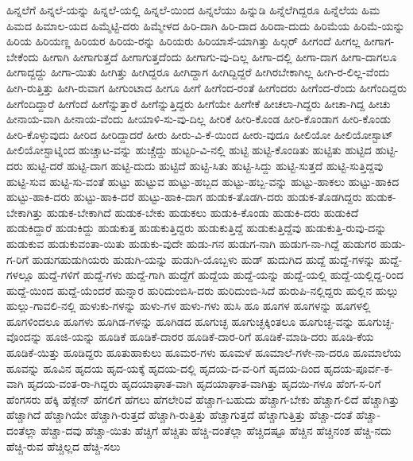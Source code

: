 {ಹಿನ್ನಲೆಗೆ
ಹಿನ್ನಲೆ-ಯನ್ನು
ಹಿನ್ನಲೆ-ಯಲ್ಲಿ
ಹಿನ್ನಲೆ-ಯಿಂದ
ಹಿನ್ನಲೆಯು
ಹಿನ್ನುಡಿ
ಹಿನ್ನೆಲೆಗಿದ್ದರೂ
ಹಿನ್ನೆಲೆಯ
ಹಿಮ
ಹಿಮದ
ಹಿಮಾಲ-ಯದ
ಹಿಮ್ಮೆಟ್ಟಿ-ದರು
ಹಿಮ್ಮೇಳದ
ಹಿರಿ-ದಾಗಿ
ಹಿರಿ-ದಾದ
ಹಿರಿದಾ-ದುದು
ಹಿರಿಮೆಯ
ಹಿರಿಮೆ-ಯನ್ನು
ಹಿರಿಯ
ಹಿರಿಯಣ್ಣ
ಹಿರಿಯರ
ಹಿರಿಯ-ರನ್ನು
ಹಿರಿಯರು
ಹಿರಿಯಾಸೆ-ಯಾಗಿತ್ತು
ಹಿಲ್ಗರ್
ಹೀಗಂದೆ
ಹೀಗಲ್ಲ
ಹೀಗಾಗ-ಬೇಕೆಂದು
ಹೀಗಾಗಿ
ಹೀಗಾಗುತ್ತದೆ
ಹೀಗಾಗುತ್ತದೆಂದು
ಹೀಗಾಗು-ವು-ದಿಲ್ಲ
ಹೀಗಾ-ದಲ್ಲಿ
ಹೀಗಾ-ದಾಗ
ಹೀಗಾ-ದಾಗಲೂ
ಹೀಗಾದ್ದದ್ದು
ಹೀಗಾ-ಯಿತು
ಹೀಗಿತ್ತು
ಹೀಗಿದ್ದರೂ
ಹೀಗಿದ್ದಾಗ
ಹೀಗಿದ್ದಿದ್ದರೆ
ಹೀಗಿರಬೇಕಾಗಿಲ್ಲ
ಹೀಗಿ-ರ-ಲಿಲ್ಲ-ವೆಂದು
ಹೀಗಿ-ರುತ್ತಿತ್ತು
ಹೀಗಿ-ರುವಾಗ
ಹೀಗುಂಟಾದ
ಹೀಗೂ
ಹೀಗೆ
ಹೀಗೆಂದ-ರಂತೆ
ಹೀಗೆಂದರು
ಹೀಗೆಂದ-ರೆಂದು
ಹೀಗೆಂದಿದ್ದರು
ಹೀಗೆಂದಿದ್ದಾರೆ
ಹೀಗೆಂದೆ
ಹೀಗೆನ್ನುತ್ತಾರೆ
ಹೀಗೆನ್ನುತ್ತಿದ್ದರು
ಹೀಗೆಯೇ
ಹೀಗೇಕೆ
ಹೀಚಲಾ-ಗಿದ್ದರು
ಹೀಚಾ-ಗಿದ್ದ
ಹೀಚು
ಹೀನಾಯ-ವಾಗಿ
ಹೀನಾಯ-ವೆಂದು
ಹೀಯಾಳಿ-ಸು-ವು-ದಿಲ್ಲ
ಹೀರಿಕೆ
ಹೀರಿ-ಕೊಂಡ
ಹೀರಿ-ಕೊಂಡಾಗ
ಹೀರಿ-ಕೊಂಡು
ಹೀರಿ-ಕೊಳ್ಳುವುದು
ಹೀರಿದ
ಹೀರಿದ್ದಾದರೆ
ಹೀರು
ಹೀರು-ವಿ-ಕೆ-ಯಿಂದ
ಹೀರು-ವುದೂ
ಹೀಲಿಯೋ
ಹೀಲಿಯೋಸ್ಟಾಟ್
ಹೀಲಿಯೋಸ್ಟಾಟ್ನಿಂದ
ಹುಚ್ಚಾಟ-ವನ್ನು
ಹುಚ್ಚೆದ್ದು
ಹುಟ್ಟರಿ-ವಿ-ನಲ್ಲಿ
ಹುಟ್ಟಿ
ಹುಟ್ಟಿ-ಕೊಂಡಿತು
ಹುಟ್ಟಿತು
ಹುಟ್ಟಿದ
ಹುಟ್ಟಿ-ದರು
ಹುಟ್ಟಿ-ದರೆ
ಹುಟ್ಟಿ-ದಾಗ
ಹುಟ್ಟಿ-ದುದು
ಹುಟ್ಟಿದೆ
ಹುಟ್ಟಿ-ಸಿತು
ಹುಟ್ಟಿ-ಸಿದ್ದು
ಹುಟ್ಟಿ-ಸುತ್ತದೆ
ಹುಟ್ಟಿ-ಸುತ್ತಿದ್ದವು
ಹುಟ್ಟಿ-ಸುವ
ಹುಟ್ಟಿ-ಸು-ವಂತೆ
ಹುಟ್ಟು
ಹುಟ್ಟುವ
ಹುಟ್ಟು-ಹಬ್ಬದ
ಹುಟ್ಟು-ಹಬ್ಬ-ವನ್ನು
ಹುಟ್ಟು-ಹಾಕಲು
ಹುಟ್ಟು-ಹಾಕಿದ
ಹುಟ್ಟು-ಹಾಕಿ-ದರು
ಹುಟ್ಟು-ಹಾಕಿ-ದರೆ
ಹುಟ್ಟು-ಹಾಕಿ-ದಾಗ
ಹುಡುಕ-ತೊಡಗಿ-ದರು
ಹುಡುಕ-ತೊಡಗಿದ್ದರು
ಹುಡುಕ-ಬೇಕಾಗಿತ್ತು
ಹುಡುಕ-ಬೇಕಾಗಿದೆ
ಹುಡುಕ-ಬೇಕು
ಹುಡುಕಲು
ಹುಡುಕಿ-ಕೊಂಡು
ಹುಡುಕಿ-ದರು
ಹುಡುಕಿದೆ
ಹುಡುಕಿದ್ದಾರೆ
ಹುಡುಕಿದ್ದು
ಹುಡುಕುತ್ತ
ಹುಡುಕುತ್ತಿದ್ದರು
ಹುಡುಕುತ್ತಿದ್ದೆ
ಹುಡುಕುತ್ತಿದ್ದೆವು
ಹುಡುಕುತ್ತಿ-ರುವು-ದನ್ನು
ಹುಡುಕುವ
ಹುಡುಕುವಂತಾ-ಯಿತು
ಹುಡುಕು-ವುದೇ
ಹುಡು-ಗನ
ಹುಡುಗ-ನಾಗಿ
ಹುಡುಗ-ನಾ-ಗಿದ್ದೆ
ಹುಡುಗರ
ಹುಡು-ಗ-ರಿಗೆ
ಹುಡುಗಹುಡುಗಿಯರು
ಹುಡುಗಿ-ಯನ್ನು
ಹುಡುಗಿ-ಯೊಬ್ಬಳು
ಹುಡ್
ಹುದುಗಿದ
ಹುದ್ದೆ
ಹುದ್ದೆ-ಗಳನ್ನು
ಹುದ್ದೆ-ಗಳಲ್ಲೂ
ಹುದ್ದೆ-ಗಳಿಗೆ
ಹುದ್ದೆ-ಗಳು
ಹುದ್ದೆ-ಗಾಗಿ
ಹುದ್ದೆಗೆ
ಹುದ್ದೆಯ
ಹುದ್ದೆ-ಯನ್ನು
ಹುದ್ದೆ-ಯಲ್ಲಿ
ಹುದ್ದೆ-ಯಲ್ಲಿದ್ದ-ರಿಂದ
ಹುದ್ದೆ-ಯಿಂದ
ಹುದ್ದೆ-ಯೆಂದರೆ
ಹುನ್ನಾರ
ಹುರಿದುಂಬಿಸಿ-ದರು
ಹುರಿದುಂಬಿ-ಸಿದೆ
ಹುರುಪಿ-ನಲ್ಲಿದ್ದರು
ಹುಲ್ಲಿನ
ಹುಲ್ಲು
ಹುಲ್ಲು-ಗಾವಲಿ-ನಲ್ಲಿ
ಹುಳುಕು-ಗಳನ್ನು
ಹುಳು-ಗಳ
ಹುಳು-ಗಳು
ಹುಸಿ
ಹೂ
ಹೂಗಳ
ಹೂಗಳನ್ನು
ಹೂಗಳಲ್ಲಿ
ಹೂಗಳಿಂದಲೂ
ಹೂಗಳು
ಹೂಗಿಡ-ಗಳನ್ನು
ಹೂಗಿಡದ
ಹೂಗುಚ್ಛ
ಹೂಗುಚ್ಛಕ್ಕಿಂತಲೂ
ಹೂಗುಚ್ಛ-ವನ್ನು
ಹೂಗುಚ್ಛ-ವೊಂದನ್ನು
ಹೂಜಿ-ಯನ್ನು
ಹೂಡಿಕೆ
ಹೂಡಿಕೆ-ದಾರರ
ಹೂಡಿಕೆ-ದಾರ-ರಿಗೆ
ಹೂಡಿಕೆ-ಮಾಡಿ-ದರು
ಹೂಡಿ-ಕೆಯ
ಹೂಡಿಕೆ-ಯಿತ್ತು
ಹೂಡಿದ್ದರು
ಹೂತುಹಾಕುಲು
ಹೂಮರ-ಗಳು
ಹೂಮಳೆ
ಹೂಮಾಲೆ-ಗಳೇ-ನಾ-ದರೂ
ಹೂಮಾಲೆಯ
ಹೂವನ್ನು
ಹೂವಿನ
ಹೃದಯ
ಹೃದ-ಯಕ್ಕೆ
ಹೃದಯ-ದಲ್ಲಿ
ಹೃದಯ-ದ-ವ-ರಿಗೆ
ಹೃದಯ-ದಿಂದ
ಹೃದಯ-ಪೂರ್ವ-ಕ-ವಾಗಿ
ಹೃದಯ-ವಂತ-ರಾ-ಗಿದ್ದರು
ಹೃದಯಾಘಾತ-ವಾಗಿ
ಹೃದಯಾಘಾತ-ವಾಗಿತ್ತು
ಹೃದಯಿ-ಗಳೂ
ಹೆಂಗ-ಸ-ರಿಗೆ
ಹೆಂಗಸರು
ಹೆಕ್ಕಿ
ಹೆಕ್ಸೇನ್
ಹೆಗಲಿಗೆ
ಹೆಗಲು
ಹೆಗಲೇರಿವೆ
ಹೆಚ್ಚಾಗ-ಬಹುದು
ಹೆಚ್ಚಾಗ-ಬೇಕು
ಹೆಚ್ಚಾಗ-ಲಿದೆ
ಹೆಚ್ಚಾಗಿತ್ತು
ಹೆಚ್ಚಾಗಿದೆ
ಹೆಚ್ಚಾಗಿಯೇ
ಹೆಚ್ಚಾಗಿ-ರುತ್ತದೆ
ಹೆಚ್ಚಾಗಿ-ರುತ್ತಿತ್ತು
ಹೆಚ್ಚಾಗುತ್ತದೆ
ಹೆಚ್ಚಾಗುತ್ತಿತ್ತು
ಹೆಚ್ಚಾ-ದಂತೆ
ಹೆಚ್ಚಾ-ದಂತೆಲ್ಲಾ
ಹೆಚ್ಚಾ-ದವು
ಹೆಚ್ಚಾ-ಯಿತು
ಹೆಚ್ಚಿಗೆ
ಹೆಚ್ಚಿತು
ಹೆಚ್ಚಿ-ದಂತೆಲ್ಲಾ
ಹೆಚ್ಚಿದಷ್ಟೂ
ಹೆಚ್ಚಿನ
ಹೆಚ್ಚಿನಂಶ
ಹೆಚ್ಚಿ-ನದು
ಹೆಚ್ಚಿ-ರುವ
ಹೆಚ್ಚಿಲ್ಲದ
ಹೆಚ್ಚಿ-ಸಲು
}
